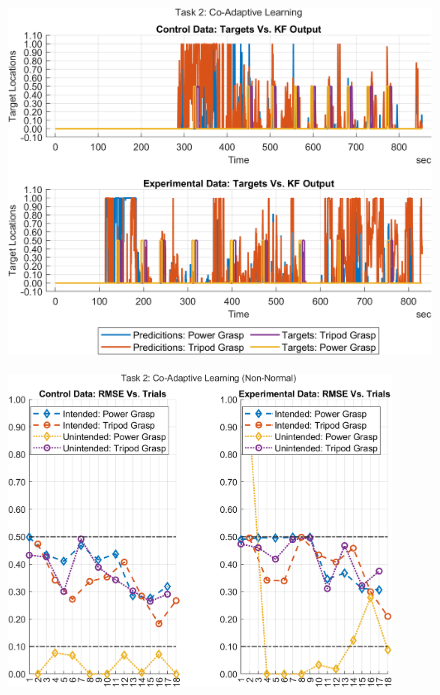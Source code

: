 \documentclass[12pt]{article}
\newcommand\figWidth{4in}
\newcommand\figWidthLarge{9.5in}
\begin{document}
    \newpage \clearpage
    \begin{landscape}
    \begin{figure}
        \includegraphics[width = \figWidthLarge]{t2-kf-out.png}
    \end{figure}
    \end{landscape}
    \newpage \clearpage
    \begin{figure}
        \includegraphics[width = \figWidth]{t2-rmse-xnorm.png}
    \end{figure}
\end{document}
